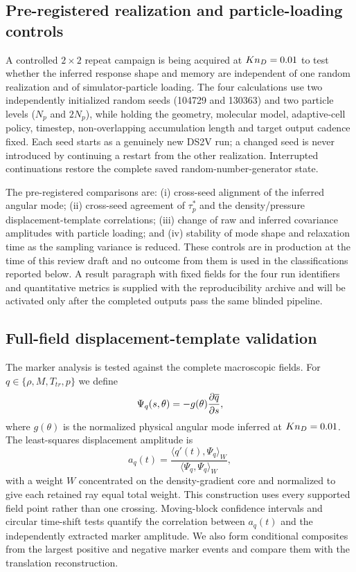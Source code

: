 \subsection{Pre-registered realization and particle-loading controls}
A controlled $2\times2$ repeat campaign is being acquired at $Kn_D=0.01$ to test whether the inferred response shape and memory are independent of one random realization and of simulator-particle loading. The four calculations use two independently initialized random seeds (104729 and 130363) and two particle levels ($N_p$ and $2N_p$), while holding the geometry, molecular model, adaptive-cell policy, timestep, non-overlapping accumulation length and target output cadence fixed. Each seed starts as a genuinely new DS2V run; a changed seed is never introduced by continuing a restart from the other realization. Interrupted continuations restore the complete saved random-number-generator state.

The pre-registered comparisons are: (i) cross-seed alignment of the inferred angular mode; (ii) cross-seed agreement of $\tau_p^*$ and the density/pressure displacement-template correlations; (iii) change of raw and inferred covariance amplitudes with particle loading; and (iv) stability of mode shape and relaxation time as the sampling variance is reduced. These controls are in production at the time of this review draft and no outcome from them is used in the classifications reported below. A result paragraph with fixed fields for the four run identifiers and quantitative metrics is supplied with the reproducibility archive and will be activated only after the completed outputs pass the same blinded pipeline.

\subsection{Full-field displacement-template validation}
The marker analysis is tested against the complete macroscopic fields. For $q\in\{\rho,M,T_{tr},p\}$ we define
\begin{equation}
 \Psi_q(s,\theta)=-g(\theta)\frac{\partial \overline{q}}{\partial s},
 \label{eq:template}
\end{equation}
where $g(\theta)$ is the normalized physical angular mode inferred at $Kn_D=0.01$. The least-squares displacement amplitude is
\begin{equation}
 a_q(t)=\frac{\langle q'(t),\Psi_q\rangle_W}{\langle \Psi_q,\Psi_q\rangle_W},
 \label{eq:amplitude}
\end{equation}
with a weight $W$ concentrated on the density-gradient core and normalized to give each retained ray equal total weight. This construction uses every supported field point rather than one crossing. Moving-block confidence intervals and circular time-shift tests quantify the correlation between $a_q(t)$ and the independently extracted marker amplitude. We also form conditional composites from the largest positive and negative marker events and compare them with the translation reconstruction.

